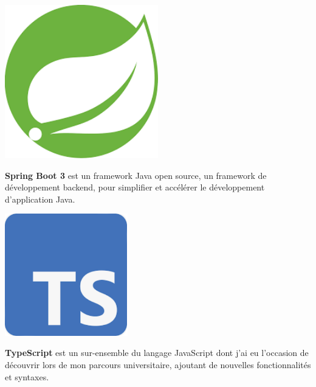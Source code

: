\begin{center}
    \begin{minipage}{\textwidth}
        \begin{minipage}{0.2\textwidth}
            \centering
            \includegraphics[width=0.5\textwidth]{images/logo/springBoot.png}
        \end{minipage}\hfill
        \begin{minipage}{0.75\textwidth}
            \textbf{Spring Boot 3} est un framework Java open source, un framework de développement backend, pour simplifier et accélérer le développement d'application Java.
        \end{minipage}
    \end{minipage}


    \vspace{2em} %
    
    \begin{minipage}{\textwidth}
        \begin{minipage}{0.2\textwidth}
            \centering
            \includegraphics[width=0.4\textwidth]{images/logo/typeScript.png}
        \end{minipage}\hfill
        \begin{minipage}{0.75\textwidth}
            \textbf{TypeScript} est un sur-ensemble du langage JavaScript dont j'ai eu l'occasion de découvrir lors de mon parcours universitaire, ajoutant de nouvelles fonctionnalités et syntaxes.
        \end{minipage}
    \end{minipage}


\end{center}
